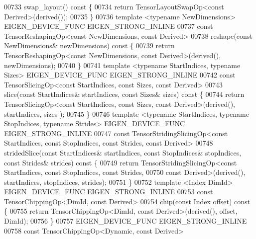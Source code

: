 \begin{DoxyCode}
00733     swap\_layout()\textcolor{keyword}{ const }\{
00734       \textcolor{keywordflow}{return} TensorLayoutSwapOp<const Derived>(derived());
00735     \}
00736     \textcolor{keyword}{template} <\textcolor{keyword}{typename} NewDimensions> EIGEN\_DEVICE\_FUNC EIGEN\_STRONG\_INLINE
00737     \textcolor{keyword}{const} TensorReshapingOp<const NewDimensions, const Derived>
00738     reshape(\textcolor{keyword}{const} NewDimensions& newDimensions)\textcolor{keyword}{ const }\{
00739       \textcolor{keywordflow}{return} TensorReshapingOp<const NewDimensions, const Derived>(derived(), newDimensions);
00740     \}
00741     \textcolor{keyword}{template} <\textcolor{keyword}{typename} StartIndices, \textcolor{keyword}{typename} Sizes> EIGEN\_DEVICE\_FUNC EIGEN\_STRONG\_INLINE
00742     \textcolor{keyword}{const} TensorSlicingOp<const StartIndices, const Sizes, const Derived>
00743     slice(\textcolor{keyword}{const} StartIndices& startIndices, \textcolor{keyword}{const} Sizes& sizes)\textcolor{keyword}{ const }\{
00744       \textcolor{keywordflow}{return} TensorSlicingOp<const StartIndices, const Sizes, const Derived>(derived(), startIndices, sizes
      );
00745     \}
00746     \textcolor{keyword}{template} <\textcolor{keyword}{typename} StartIndices, \textcolor{keyword}{typename} StopIndices, \textcolor{keyword}{typename} Str\textcolor{keywordtype}{id}es> EIGEN\_DEVICE\_FUNC 
      EIGEN\_STRONG\_INLINE
00747     \textcolor{keyword}{const} TensorStridingSlicingOp<const StartIndices, const StopIndices, const Strides, const Derived>
00748     stridedSlice(\textcolor{keyword}{const} StartIndices& startIndices, \textcolor{keyword}{const} StopIndices& stopIndices, \textcolor{keyword}{const} Strides& strides)\textcolor{keyword}{
       const }\{
00749       \textcolor{keywordflow}{return} TensorStridingSlicingOp<\textcolor{keyword}{const} StartIndices, \textcolor{keyword}{const} StopIndices, \textcolor{keyword}{const} Strides,
00750                                 \textcolor{keyword}{const} Derived>(derived(), startIndices, stopIndices, strides);
00751     \}
00752     \textcolor{keyword}{template} <Index DimId> EIGEN\_DEVICE\_FUNC EIGEN\_STRONG\_INLINE
00753     \textcolor{keyword}{const} TensorChippingOp<DimId, const Derived>
00754     chip(\textcolor{keyword}{const} Index offset)\textcolor{keyword}{ const }\{
00755       \textcolor{keywordflow}{return} TensorChippingOp<DimId, const Derived>(derived(), offset, DimId);
00756     \}
00757     EIGEN\_DEVICE\_FUNC EIGEN\_STRONG\_INLINE
00758     \textcolor{keyword}{const} TensorChippingOp<Dynamic, const Derived>

\end{DoxyCode}
